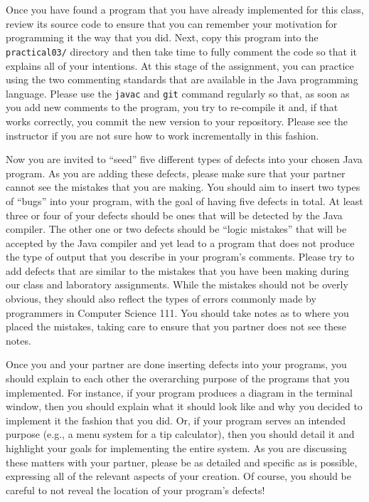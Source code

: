 Once you have found a program that you have already implemented for this class, review its source code to ensure that
you can remember your motivation for programming it the way that you did. Next, copy this program into the {\tt
practical03/} directory and then take time to fully comment the code so that it explains all of your intentions. At this
stage of the assignment, you can practice using the two commenting standards that are available in the Java programming
language. Please use the {\tt javac} and {\tt git} command regularly so that, as soon as you add new comments to the
program, you try to re-compile it and, if that works correctly, you commit the new version to your repository. Please
see the instructor if you are not sure how to work incrementally in this fashion.

Now you are invited to ``seed'' five different types of defects into your chosen Java program. As you are adding these
defects, please make sure that your partner cannot see the mistakes that you are making. You should aim to insert two
types of ``bugs'' into your program, with the goal of having five defects in total. At least three or four of your defects
should be ones that will be detected by the Java compiler. The other one or two defects should be ``logic mistakes''
that will be accepted by the Java compiler and yet lead to a program that does not produce the type of output that you
describe in your program's comments. Please try to add defects that are similar to the mistakes that you have been
making during our class and laboratory assignments. While the mistakes should not be overly obvious, they should also
reflect the types of errors commonly made by programmers in Computer Science 111. You should take notes as to where you
placed the mistakes, taking care to ensure that you partner does not see these notes.

Once you and your partner are done inserting defects into your programs, you should explain to each other the
overarching purpose of the programs that you implemented. For instance, if your program produces a diagram in the
terminal window, then you should explain what it should look like and why you decided to implement it the fashion that
you did. Or, if your program serves an intended purpose (e.g., a menu system for a tip calculator), then you should
detail it and highlight your goals for implementing the entire system. As you are discussing these matters with your
partner, please be as detailed and specific as is possible, expressing all of the relevant aspects of your creation. Of
course, you should be careful to not reveal the location of your program's defects!

